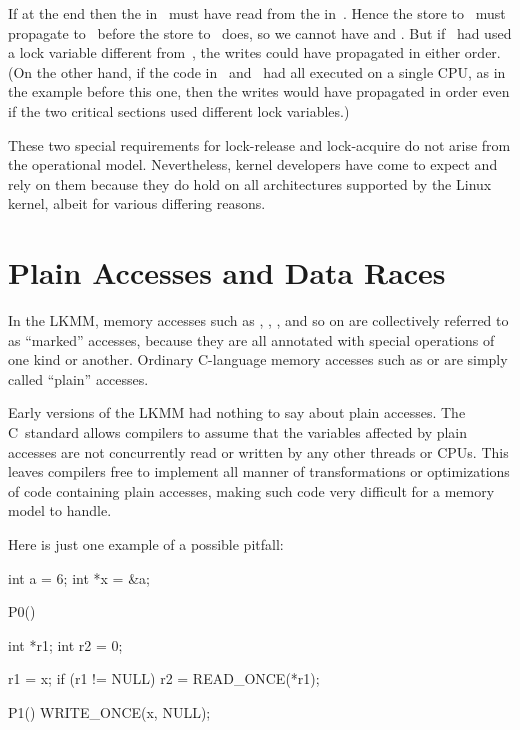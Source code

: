 If  at the end then the  in~ must
have read from
the  in~.
Hence the store to~ must propagate to~
before the store to~ does, so we cannot have  and
.
But
if ~had used a lock variable different from~, the writes could have
propagated in either order.
(On the other hand, if the code in~ and~
had all executed on a single CPU, as in the example before this
one, then the writes would have propagated in order even if the two
critical sections used different lock variables.)

These two special requirements for lock-release and lock-acquire do
not arise from the operational model.
Nevertheless, kernel developers
have come to expect and rely on them because they do hold on all
architectures supported by the Linux kernel, albeit for various
differing reasons.


\section{Plain Accesses and Data Races}
\label{sec:docs:explanation:Plain Accesses and Data Races}

In the LKMM, memory accesses such as , ,
, and so on are collectively referred to as
``marked'' accesses, because they are all annotated with special
operations of one kind or another.
Ordinary C-language memory
accesses such as  or  are simply called ``plain'' accesses.

Early versions of the LKMM had nothing to say about plain accesses.
The C~standard allows compilers to assume that the variables affected
by plain accesses are not concurrently read or written by any other
threads or CPUs.
This leaves compilers free to implement all manner
of transformations or optimizations of code containing plain accesses,
making such code very difficult for a memory model to handle.

Here is just one example of a possible pitfall:

\begin{VerbatimU}
	int a = 6;
	int *x = &a;

	P0()
	{
		int *r1;
		int r2 = 0;

		r1 = x;
		if (r1 != NULL)
			r2 = READ_ONCE(*r1);
	}

	P1()
	{
		WRITE_ONCE(x, NULL);
	}
\end{VerbatimU}


